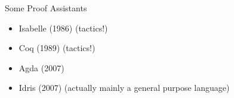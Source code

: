 \documentclass{beamer}
\begin{document}
\begin{frame}{Some Proof Assistants}
  \begin{itemize}
    \item Isabelle (1986) (tactics!)
    \item Coq (1989) (tactics!)
    \item Agda (2007)
    \item Idris (2007) (actually mainly a general purpose language)
  \end{itemize}
\end{frame}
\end{document}
